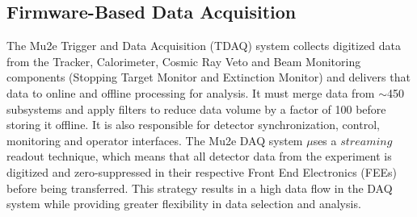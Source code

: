 \subsection{Firmware-Based Data Acquisition}
The Mu2e Trigger and Data Acquisition (TDAQ) system collects digitized data from the Tracker, Calorimeter, Cosmic Ray Veto and Beam Monitoring components (Stopping Target Monitor and Extinction Monitor) and delivers that data to online and offline processing for analysis. It must merge data from $\sim$450 subsystems and apply filters to reduce data volume by a factor of 100 before storing it offline. It is also responsible for detector synchronization, control, monitoring and operator interfaces. The Mu2e DAQ system $\mu$ses a $streaming$ readout technique, which means that all detector data from the experiment is digitized and zero-suppressed in their respective Front End Electronics (FEEs) before being transferred. This strategy results in a high data flow in the DAQ system while providing greater flexibility in data selection and analysis.
